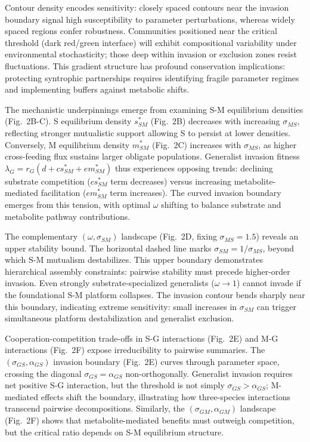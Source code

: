\documentclass[9pt,twocolumn,twoside]{pnas-new}
\begin{document}
Contour density encodes sensitivity: closely spaced contours near the invasion boundary signal high susceptibility to parameter perturbations, whereas widely spaced regions confer robustness. Communities positioned near the critical threshold (dark red/green interface) will exhibit compositional variability under environmental stochasticity; those deep within invasion or exclusion zones resist fluctuations. This gradient structure has profound conservation implications: protecting syntrophic partnerships requires identifying fragile parameter regimes and implementing buffers against metabolic shifts.

The mechanistic underpinnings emerge from examining S-M equilibrium densities (Fig.~2B-C). S equilibrium density $s^*_{SM}$ (Fig.~2B) decreases with increasing $\sigma_{MS}$, reflecting stronger mutualistic support allowing S to persist at lower densities. Conversely, M equilibrium density $m^*_{SM}$ (Fig.~2C) increases with $\sigma_{MS}$, as higher cross-feeding flux sustains larger obligate populations. Generalist invasion fitness $\lambda_G = r_G(d + c s^*_{SM} + e m^*_{SM})$ thus experiences opposing trends: declining substrate competition ($c s^*_{SM}$ term decreases) versus increasing metabolite-mediated facilitation ($e m^*_{SM}$ term increases). The curved invasion boundary emerges from this tension, with optimal $\omega$ shifting to balance substrate and metabolite pathway contributions.

The complementary $(\omega, \sigma_{SM})$ landscape (Fig.~2D, fixing $\sigma_{MS} = 1.5$) reveals an upper stability bound. The horizontal dashed line marks $\sigma_{SM} = 1/\sigma_{MS}$, beyond which S-M mutualism destabilizes. This upper boundary demonstrates hierarchical assembly constraints: pairwise stability must precede higher-order invasion. Even strongly substrate-specialized generalists ($\omega \to 1$) cannot invade if the foundational S-M platform collapses. The invasion contour bends sharply near this boundary, indicating extreme sensitivity: small increases in $\sigma_{SM}$ can trigger simultaneous platform destabilization and generalist exclusion.

Cooperation-competition trade-offs in S-G interactions (Fig.~2E) and M-G interactions (Fig.~2F) expose irreducibility to pairwise summaries. The $(\sigma_{GS}, \alpha_{GS})$ invasion boundary (Fig.~2E) curves through parameter space, crossing the diagonal $\sigma_{GS} = \alpha_{GS}$ non-orthogonally. Generalist invasion requires net positive S-G interaction, but the threshold is not simply $\sigma_{GS} > \alpha_{GS}$; M-mediated effects shift the boundary, illustrating how three-species interactions transcend pairwise decompositions. Similarly, the $(\sigma_{GM}, \alpha_{GM})$ landscape (Fig.~2F) shows that metabolite-mediated benefits must outweigh competition, but the critical ratio depends on S-M equilibrium structure.
\end{document}

